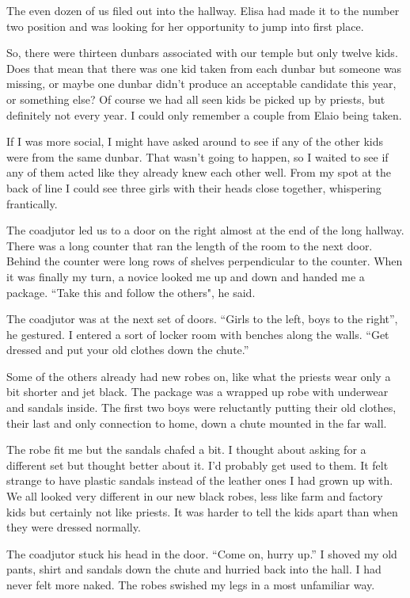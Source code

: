 The even dozen of us filed out into the hallway. Elisa had made it to the number two position and was looking for her opportunity to jump into first place.

So, there were thirteen dunbars associated with our temple but only twelve kids. Does that mean that there was one kid taken from each dunbar but someone was missing, or maybe one dunbar didn't produce an acceptable candidate this year, or something else? Of course we had all seen kids be picked up by priests, but definitely not every year. I could only remember a couple from Elaio being taken.

If I was more social, I might have asked around to see if any of the other kids were from the same dunbar. That wasn't going to happen, so I waited to see if any of them acted like they already knew each other well. From my spot at the back of line I could see three girls with their heads close together, whispering frantically.

The coadjutor led us to a door on the right almost at the end of the long hallway. There was a long counter that ran the length of the room to the next door. Behind the counter were long rows of shelves perpendicular to the counter. When it was finally my turn, a novice looked me up and down and handed me a package. ``Take this and follow the others", he said.

The coadjutor was at the next set of doors. ``Girls to the left, boys to the right'', he gestured. I entered a sort of locker room with benches along the walls. ``Get dressed and put your old clothes down the chute.''

Some of the others already had new robes on, like what the priests wear only a bit shorter and jet black. The package was a wrapped up robe with underwear and sandals inside. The first two boys were reluctantly putting their old clothes, their last and only connection to home, down a chute mounted in the far wall.

The robe fit me but the sandals chafed a bit. I thought about asking for a different set but thought better about it. I'd probably get used to them. It felt strange to have plastic sandals instead of the leather ones I had grown up with. We all looked very different in our new black robes, less like farm and factory kids but certainly not like priests. It was harder to tell the kids apart than when they were dressed normally.

The coadjutor stuck his head in the door. ``Come on, hurry up.'' I shoved my old pants, shirt and sandals down the chute and hurried back into the hall. I had never felt more naked. The robes swished my legs in a most unfamiliar way.

